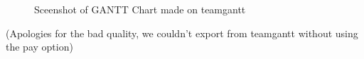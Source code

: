 \documentclass{article}
\begin{document}
\begin{figure}[H]
    \centering
    \caption{Sceenshot of GANTT Chart made on teamgantt}
    \label{fig:gantt_chart}
\end{figure}

(Apologies for the bad quality, we couldn't export from teamgantt without using the pay option)

\newpage

\printbibliography
\end{document}
